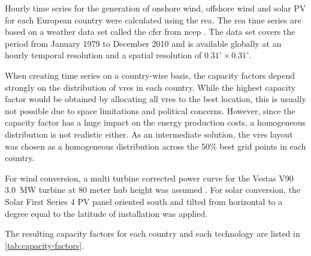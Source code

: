 \documentclass[a4paper, 5p, sort&compress]{elsarticle}%
\begin{document}
Hourly time series for the generation of onshore wind, offshore wind and solar PV for each
European country were calculated using the \gls{rea}. The \gls{rea} time series are based on a
weather data set called the \gls{cfsr} from \gls{ncep} \cite{Saha}. The data set covers the period
from January 1979 to December 2010 and is available globally at an hourly temporal resolution
and a spatial resolution of $0.31^\circ \times 0.31^\circ$.

When creating time series on a country-wise basis, the capacity
factors depend strongly on the distribution of \gls{vres} in each
country. While the highest capacity factor would be obtained by
allocating all \gls{vres} to the best location, this is usually not
possible due to space limitations and political concerns. However,
since the capacity factor has a huge impact on the energy production
costs, a homogeneous distribution is not realistic either. As an
intermediate solution, the \gls{vres} layout was chosen as a
homogeneous distribution across the 50\% best grid points in each
country.

For wind conversion, a multi turbine
corrected power curve for the Vestas V90 3.0~MW turbine at 80 meter
hub height was assumed \cite{REA}. For solar conversion, the Solar First Series 4
PV panel oriented south and tilted from horizontal to a degree equal
to the latitude of installation was applied. %

The resulting capacity factors for each country and each technology are listed in
\cref{tab:capacity-factors}.
\end{document}

